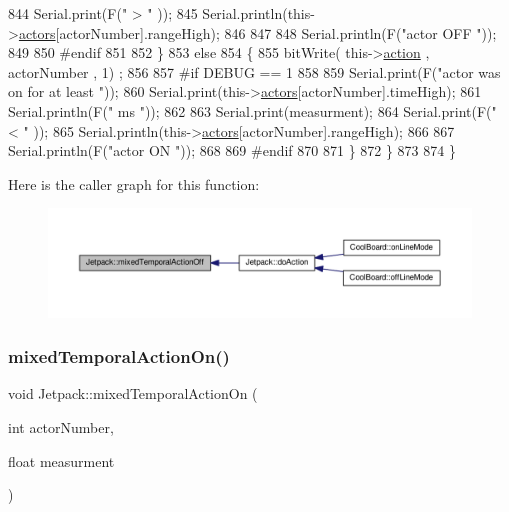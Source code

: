 \begin{DoxyCode}
844             Serial.print(F(\textcolor{stringliteral}{" > "} ));
845             Serial.println(this->\hyperlink{class_jetpack_a7e16d2f97837f9712a2e6de1c50d99db}{actors}[actorNumber].rangeHigh);
846 
847             
848             Serial.println(F(\textcolor{stringliteral}{"actor OFF "}));
849 
850 \textcolor{preprocessor}{        #endif}
851 
852         \}
853         \textcolor{keywordflow}{else} 
854         \{
855             bitWrite( this->\hyperlink{class_jetpack_aca3142925a7b0834b34ae91d26af7765}{action} , actorNumber , 1) ;
856 
857 \textcolor{preprocessor}{        #if DEBUG == 1 }
858             
859             Serial.print(F(\textcolor{stringliteral}{"actor was on for at least "}));
860             Serial.print(this->\hyperlink{class_jetpack_a7e16d2f97837f9712a2e6de1c50d99db}{actors}[actorNumber].timeHigh);
861             Serial.println(F(\textcolor{stringliteral}{" ms "}));
862 
863             Serial.print(measurment);
864             Serial.print(F(\textcolor{stringliteral}{" < "} ));
865             Serial.println(this->\hyperlink{class_jetpack_a7e16d2f97837f9712a2e6de1c50d99db}{actors}[actorNumber].rangeHigh);
866 
867             Serial.println(F(\textcolor{stringliteral}{"actor ON "}));
868 
869 \textcolor{preprocessor}{        #endif              }
870 
871         \}           
872     \}
873 
874 \}
\end{DoxyCode}
Here is the caller graph for this function\+:\nopagebreak
\begin{figure}[H]
\begin{center}
\leavevmode
\includegraphics[width=350pt]{df/d1d/class_jetpack_af2f567ef6311a8fc2f7bb948837667b7_icgraph}
\end{center}
\end{figure}
\mbox{\label{class_jetpack_af44bc8a08818e4433dfb1c7104601f12}} 
\subsubsection{\texorpdfstring{mixed\+Temporal\+Action\+On()}{mixedTemporalActionOn()}}
{\footnotesize\ttfamily void Jetpack\+::mixed\+Temporal\+Action\+On (\begin{DoxyParamCaption}\item[{int}]{actor\+Number,  }\item[{float}]{measurment }\end{DoxyParamCaption})}

